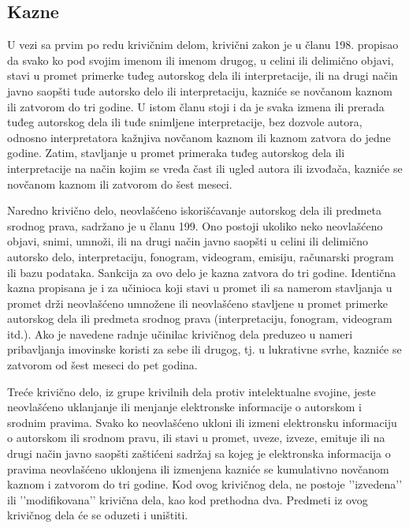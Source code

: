 \documentclass[a4paper]{article}
\begin{document}
\subsection{Kazne}

U vezi sa prvim po redu krivičnim delom, krivični zakon \cite{KZ} je u članu 198. propisao da svako ko pod svojim imenom ili imenom drugog, u celini ili delimično objavi, stavi u promet primerke tuđeg autorskog dela ili interpretacije, ili na drugi način javno saopšti tuđe autorsko delo ili interpretaciju, kazniće se novčanom kaznom ili zatvorom do tri godine. U istom članu stoji i da je svaka izmena ili prerada tuđeg autorskog dela ili tuđe snimljene interpretacije, bez dozvole autora, odnosno interpretatora kažnjiva novčanom kaznom ili kaznom zatvora do jedne godine. Zatim, stavljanje u promet primeraka tuđeg autorskog dela ili interpretacije na način kojim se vređa čast ili ugled autora ili izvođača, kazniće se novčanom kaznom ili zatvorom do šest meseci.

Naredno krivično delo, neovlašćeno iskorišćavanje autorskog dela ili predmeta srodnog prava, sadržano je u članu 199. Ono postoji ukoliko neko neovlašćeno objavi, snimi, umnoži, ili na drugi način javno saopšti u celini ili delimično autorsko delo, interpretaciju, fonogram, videogram, emisiju, računarski program ili bazu podataka. Sankcija za ovo delo je kazna zatvora do tri godine. Identična kazna propisana je i za učinioca koji stavi u promet ili sa namerom stavljanja u promet drži neovlašćeno umnožene ili neovlašćeno stavljene u promet primerke autorskog dela ili predmeta srodnog prava (interpretaciju, fonogram, videogram itd.). Ako je navedene radnje učinilac krivičnog dela preduzeo u nameri pribavljanja imovinske koristi za sebe ili drugog, tj. u lukrativne svrhe, kazniće se zatvorom od šest meseci do pet godina.

Treće krivično delo, iz grupe krivilnih dela protiv intelektualne svojine, jeste neovlašćeno uklanjanje ili menjanje elektronske informacije o autorskom i srodnim pravima. Svako ko neovlašćeno ukloni ili izmeni elektronsku informaciju o autorskom ili srodnom pravu, ili stavi u promet, uveze, izveze, emituje ili na drugi način javno saopšti zaštićeni sadržaj sa kojeg je elektronska informacija o pravima neovlašćeno uklonjena ili izmenjena kazniće se kumulativno novčanom kaznom i zatvorom do tri godine. Kod ovog krivičnog dela, ne postoje ’’izvedena’’ ili ’’modifikovana’’ krivična dela, kao kod prethodna dva. Predmeti iz ovog krivičnog dela će se oduzeti i uništiti.
\end{document}
